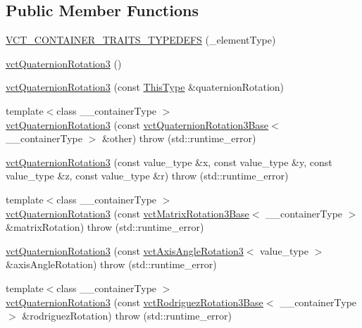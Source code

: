 \subsection*{Public Member Functions}
\begin{DoxyCompactItemize}
\item 
\hyperlink{classvct_quaternion_rotation3_a21ab53315a516e984a6700808c46c02a}{V\+C\+T\+\_\+\+C\+O\+N\+T\+A\+I\+N\+E\+R\+\_\+\+T\+R\+A\+I\+T\+S\+\_\+\+T\+Y\+P\+E\+D\+E\+F\+S} (\+\_\+element\+Type)
\item 
\hyperlink{classvct_quaternion_rotation3_aed78b9378e74d3ba8b71349472c57a67}{vct\+Quaternion\+Rotation3} ()
\item 
\hyperlink{classvct_quaternion_rotation3_a02447e98501a97832e7196dee7b9c2dc}{vct\+Quaternion\+Rotation3} (const \hyperlink{classvct_fixed_size_const_vector_base_a071063bc4fa43112cc287b2dbef53180}{This\+Type} \&quaternion\+Rotation)
\item 
{\footnotesize template$<$class \+\_\+\+\_\+container\+Type $>$ }\\\hyperlink{classvct_quaternion_rotation3_a92d85d26e54699772e450caf5f362534}{vct\+Quaternion\+Rotation3} (const \hyperlink{classvct_quaternion_rotation3_base}{vct\+Quaternion\+Rotation3\+Base}$<$ \+\_\+\+\_\+container\+Type $>$ \&other)  throw (std\+::runtime\+\_\+error)
\item 
\hyperlink{classvct_quaternion_rotation3_abc8fde980116d00d463f09bdf9218133}{vct\+Quaternion\+Rotation3} (const value\+\_\+type \&x, const value\+\_\+type \&y, const value\+\_\+type \&z, const value\+\_\+type \&r)  throw (std\+::runtime\+\_\+error)
\item 
{\footnotesize template$<$class \+\_\+\+\_\+container\+Type $>$ }\\\hyperlink{classvct_quaternion_rotation3_a61569b6daf69e5b0a42edb6681c73c35}{vct\+Quaternion\+Rotation3} (const \hyperlink{classvct_matrix_rotation3_base}{vct\+Matrix\+Rotation3\+Base}$<$ \+\_\+\+\_\+container\+Type $>$ \&matrix\+Rotation)  throw (std\+::runtime\+\_\+error)
\item 
\hyperlink{classvct_quaternion_rotation3_a719e8e89a3eac0d6a487ed81affc6271}{vct\+Quaternion\+Rotation3} (const \hyperlink{classvct_axis_angle_rotation3}{vct\+Axis\+Angle\+Rotation3}$<$ value\+\_\+type $>$ \&axis\+Angle\+Rotation)  throw (std\+::runtime\+\_\+error)
\item 
{\footnotesize template$<$class \+\_\+\+\_\+container\+Type $>$ }\\\hyperlink{classvct_quaternion_rotation3_aaa36f8d822d685d004215863f090fe37}{vct\+Quaternion\+Rotation3} (const \hyperlink{classvct_rodriguez_rotation3_base}{vct\+Rodriguez\+Rotation3\+Base}$<$ \+\_\+\+\_\+container\+Type $>$ \&rodriguez\+Rotation)  throw (std\+::runtime\+\_\+error)

\end{DoxyCompactItemize}
